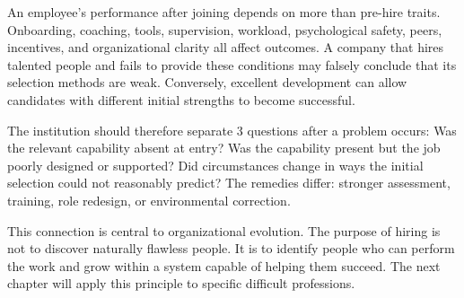An employee's performance after joining depends on more than pre-hire traits. Onboarding, coaching, tools, supervision, workload, psychological safety, peers, incentives, and organizational clarity all affect outcomes. A company that hires talented people and fails to provide these conditions may falsely conclude that its selection methods are weak. Conversely, excellent development can allow candidates with different initial strengths to become successful.

The institution should therefore separate 3 questions after a problem occurs: Was the relevant capability absent at entry? Was the capability present but the job poorly designed or supported? Did circumstances change in ways the initial selection could not reasonably predict? The remedies differ: stronger assessment, training, role redesign, or environmental correction.

This connection is central to organizational evolution. The purpose of hiring is not to discover naturally flawless people. It is to identify people who can perform the work and grow within a system capable of helping them succeed. The next chapter will apply this principle to specific difficult professions.
